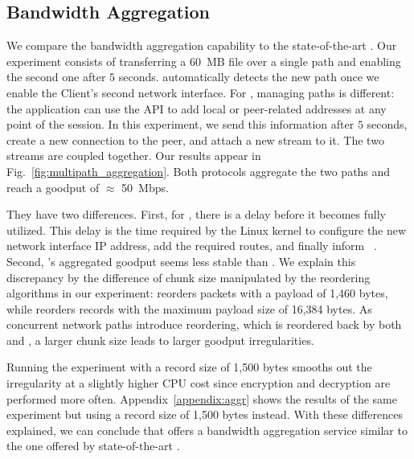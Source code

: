 \subsection{Bandwidth Aggregation}
\label{sec:bwaggr}
We compare the \tcpls bandwidth aggregation capability to the state-of-the-art
\mptcp.
Our experiment consists of transferring a 60~MB file over a single path
and enabling the second one after $5$ seconds. \mptcp automatically detects
the new path once we enable the Client's second network interface. For \tcpls,
managing paths is different: the application can use the API to add local or
peer-related addresses at any point of the session. In this experiment, we send
this information after $5$ seconds, create a new \tcp connection to the peer,
and attach a new stream to it. The two streams are coupled together. Our results
appear in Fig.~\ref{fig:multipath_aggregation}. Both protocols aggregate the
two paths and reach a goodput of $\approx$ 50~Mbps.

They have two differences. First, for \mptcp, there is a delay before it becomes fully utilized. This delay is the time required by the Linux kernel
to configure the new network interface IP address, add the required routes, and
finally inform \mptcp~\cite{paasch2012exploring}.
Second, \tcpls's aggregated goodput seems less stable than \mptcp. We explain
this discrepancy by the difference of chunk size manipulated by the reordering
algorithms in our experiment: \mptcp reorders packets with a payload of 1,460
bytes, while \tcpls reorders records with the maximum payload size of 16,384 bytes. As concurrent network paths introduce reordering, which is reordered back by both \mptcp and \tcpls, a larger chunk size leads to larger goodput irregularities.

Running the experiment with a record size of 1,500 bytes smooths out the irregularity at a slightly higher CPU cost since encryption and decryption are performed more often. Appendix~\ref{appendix:aggr} shows the results of the same experiment but using a \tls record size of 1,500 bytes instead. With these differences explained, we can conclude that \tcpls offers a bandwidth aggregation service similar to the one offered by state-of-the-art \mptcp.

